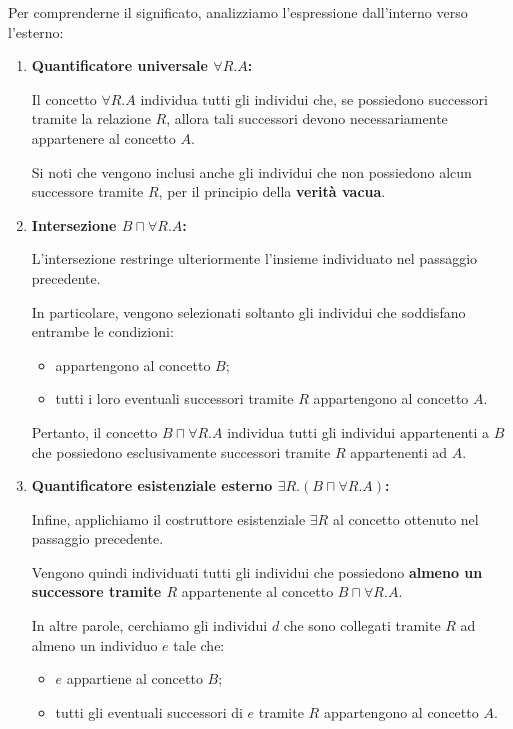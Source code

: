 Per comprenderne il significato, analizziamo
l'espressione dall'interno verso l'esterno:

\begin{enumerate}
    \item \textbf{Quantificatore universale $\forall R.A$:}

    Il concetto $\forall R.A$ individua tutti gli individui
    che, se possiedono successori tramite la relazione $R$,
    allora tali successori devono necessariamente
    appartenere al concetto $A$.

    Si noti che vengono inclusi anche gli individui
    che non possiedono alcun successore tramite $R$,
    per il principio della \textbf{verità vacua}.

    \item \textbf{Intersezione $B\sqcap\forall R.A$:}

    L'intersezione restringe ulteriormente
    l'insieme individuato nel passaggio precedente.

    In particolare, vengono selezionati soltanto
    gli individui che soddisfano entrambe le condizioni:
    \begin{itemize}
        \item appartengono al concetto $B$;
        \item tutti i loro eventuali successori tramite $R$
        appartengono al concetto $A$.
    \end{itemize}

    Pertanto, il concetto $B\sqcap\forall R.A$
    individua tutti gli individui appartenenti a $B$
    che possiedono esclusivamente successori
    tramite $R$ appartenenti ad $A$.

    \item \textbf{Quantificatore esistenziale esterno
    $\exists R.(B\sqcap\forall R.A)$:}

    Infine, applichiamo il costruttore esistenziale
    $\exists R$ al concetto ottenuto nel passaggio
    precedente.

    Vengono quindi individuati tutti gli individui
    che possiedono \textbf{almeno un successore tramite $R$}
    appartenente al concetto $B\sqcap\forall R.A$.

    In altre parole, cerchiamo gli individui $d$
    che sono collegati tramite $R$ ad almeno
    un individuo $e$ tale che:
    \begin{itemize}
        \item $e$ appartiene al concetto $B$;
        \item tutti gli eventuali successori di $e$
        tramite $R$ appartengono al concetto $A$.
    \end{itemize}
\end{enumerate}

